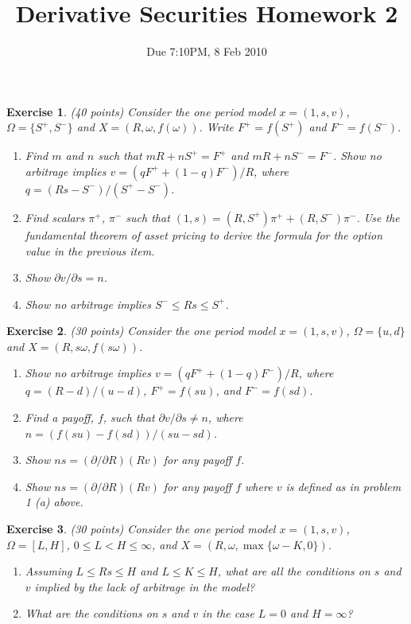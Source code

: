 \documentclass[11pt,fleqn]{amsproc}
\newtheorem{xca}{Exercise}
\begin{document}
\title{Derivative Securities Homework 2}
\author{Due 7:10PM, 8 Feb 2010}

\maketitle

\begin{xca}{(40 points)}
Consider the one period model $x = (1, s, v)$, $\Omega = \{S^+, S^-\}$ and
$X = (R, \omega, f(\omega))$.  Write $F^+ = f(S^+)$ and $F^- = f(S^-)$.
\begin{enumerate}
\item Find $m$ and $n$ such that $m R + n S^+ = F^+$ and
$m R + n S^- = F^-$. Show no arbitrage implies
$v = (qF^+ + (1 - q)F^-)/R$, where $q = (Rs - S^-)/(S^+ - S^-)$.
\item Find scalars $\pi^+$, $\pi^-$ such that
$(1, s) = (R, S^+)\pi^+ + (R, S^-)\pi^-$. Use the fundamental theorem
of asset pricing to derive the formula for the option value in the
previous item.
\item Show $\partial v/\partial s = n$.
\item Show no arbitrage implies $S^-\le Rs \le S^+$.
\end{enumerate}
\end{xca}

\begin{xca}{(30 points)}
Consider the one period model $x = (1, s, v)$,
$\Omega = \{u, d\}$ and $X = (R, s\omega, f(s\omega))$.
\begin{enumerate}
\item Show no arbitrage implies $v = (qF^+ + (1 - q)F^-)/R$, where
$q = (R - d)/(u - d)$, $F^+ = f(su)$, and $F^- = f(sd)$.
\item Find a payoff, $f$, such that $\partial v/\partial s \not= n$, where
$n = (f (su) - f (sd))/(su - sd)$.
\item Show $ns = (\partial/\partial R)(Rv)$ for any payoff $f$.
\item Show $ns = (\partial/\partial R)(Rv)$ for any payoff $f$
where $v$ is defined as in problem 1 (a) above.
\end{enumerate}

\end{xca}

\begin{xca}{(30 points)}
Consider the one period model $x = (1, s, v)$,
$\Omega = [L,H]$, $0\le L < H \le\infty$, and
$X = (R, \omega, \max\{\omega - K, 0\})$.
\begin{enumerate}
\item Assuming $L\le Rs\le H$ and $L\le K\le H$, what are all the conditions on $s$ and $v$ implied by the lack
of arbitrage in the model?
\item What are the conditions on $s$ and $v$ in the case $L = 0$ and
$H = \infty$?
\end{enumerate}
\end{xca}
\end{document}

